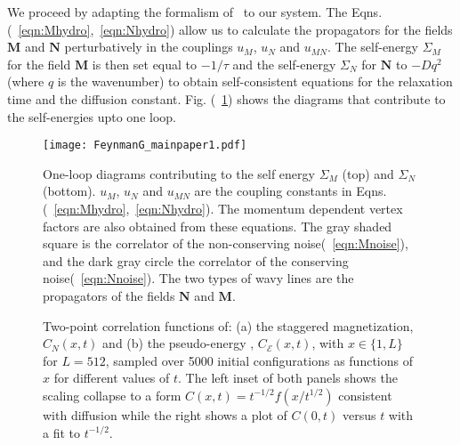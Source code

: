 \documentclass[prl,aps,twocolumn,nosuperscriptaddress,bibnotes,notitlepage,nofootinbib]{revtex4-2}
\newcommand{\magg}{\mathbf{M}}
\newcommand{\stagg}{\mathbf{N}}
\begin{document}
We proceed by adapting the formalism of~\cite{PhysRevB.11.4077} to our system. The Eqns.(~\ref{eqn:Mhydro},~\ref{eqn:Nhydro}) allow us to calculate the propagators for the fields $\magg$ and $\stagg$ perturbatively in the couplings $u_M$, $u_N$ and $u_{MN}$. The self-energy $\Sigma_M$ for the field $\magg$ is then set equal to $-1/\tau$ and the self-energy $\Sigma_N$ for $\stagg$ to $-Dq^2$ (where $q$ is the wavenumber) to obtain self-consistent equations for the relaxation time and the diffusion constant. Fig. (~\ref{fig:Oneloop_FeynG}) shows the diagrams that contribute to the self-energies upto one loop. 
\begin{figure}[H]
    \centering
    \texttt{[image: FeynmanG\_mainpaper1.pdf]}
    \caption{\small One-loop diagrams contributing to the self energy $\Sigma_M$ (top) and $\Sigma_N$ (bottom). $u_M$, $u_N$ and $u_{MN}$ are the coupling constants in Eqns.(~\ref{eqn:Mhydro},~\ref{eqn:Nhydro}). The momentum dependent vertex factors are also obtained from these equations. The gray shaded square is the correlator of the non-conserving noise(~\ref{eqn:Mnoise}), and the dark gray circle the correlator of the conserving noise(~\ref{eqn:Nnoise}). The two types of wavy lines are the propagators of the fields $\stagg$ and $\magg$.}
    \label{fig:Oneloop_FeynG}
\end{figure}

\begin{figure*}[htp]
\centering
{}
  \label{fig:Nxt_correlations}
\quad \quad \quad 
{}
     \label{fig:CENxt_correlations}
\caption{ \small Two-point correlation functions of: (a) the staggered magnetization, $C_{N}(x,t)$ and (b) the pseudo-energy , $C_{\mathcal{E}}(x,t)$, with $x \in \{1,L\}$ for $L=512$, sampled over 5000 initial configurations as functions of $x$ for different values of $t$. The left inset of both panels shows the scaling collapse to a form $C(x,t) = t^{-1/2}f(x/t^{1/2})$ consistent with diffusion while the right shows a plot of $C(0,t)$ versus $t$ with a fit to $t^{-1/2}$.}
\label{fig:NN_EN_corrxt}
\end{figure*}
\end{document}

